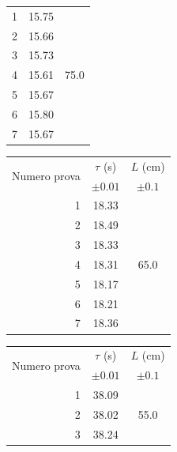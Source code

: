 \documentclass{article}
\begin{document}
\begin{table}[h!]
\begin{minipage}{0.1\textwidth}
\begin{tabular}{ | r | c | c | }
    			\hline
    			1 & 15.75 & \multirow{7}{*}{75.0} \\ \cline{1-2}
    			2 & 15.66 & \\ \cline{1-2}
    			3 & 15.73 & \\ \cline{1-2}
    			4 & 15.61 & \\ \cline{1-2}
    			5 & 15.67 & \\ \cline{1-2}
    			6 & 15.80 & \\ \cline{1-2}
    			7 & 15.67 & \\ \cline{1-2}
    			\hline
		\end{tabular}
		\hspace{0.05\textwidth}
	\end{minipage}
\end{table}
\begin{table}[h!]
	\hspace{-0.05\textwidth}
	\begin{minipage}{0.1\textwidth}
			\begin{tabular}{ | r | c | c | }
    				\hline
    				\multirow{2}{5em}{Numero prova} & $\tau$ (s) & $L$ (cm) \\
    				& $\pm 0.01$ & $\pm 0.1$ \\
    				\hline
    				1 & 18.33 & \multirow{7}{*}{65.0} \\ \cline{1-2}
    				2 & 18.49 & \\ \cline{1-2}
    				3 & 18.33 & \\ \cline{1-2}
    				4 & 18.31 & \\ \cline{1-2}
    				5 & 18.17 & \\ \cline{1-2}
    				6 & 18.21 & \\ \cline{1-2}
    				7 & 18.36 & \\ \cline{1-2}
    				\hline
			\end{tabular}
	\end{minipage}
	\hspace{0.3\textwidth}
	\begin{minipage}{0.1\textwidth}
			\begin{tabular}{ | r | c | c | }
    				\hline
    				\multirow{2}{5em}{Numero prova} & $\tau$ (s) & $L$ (cm) \\
    				& $\pm 0.01$ & $\pm 0.1$ \\
    				\hline
    				1 & 38.09 & \multirow{7}{*}{55.0} \\ \cline{1-2}
    				2 & 38.02 & \\ \cline{1-2}
    				3 & 38.24 & \\ \cline{1-2}

\end{tabular}
\end{minipage}
\end{table}
\end{document}
